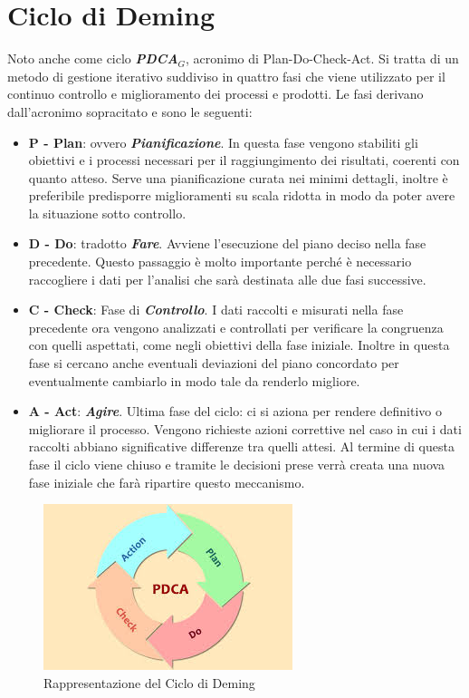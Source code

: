 \chapter{Ciclo di Deming}\label{CicloDiDeming}
Noto anche come ciclo \textbf{\textit{PDCA$_G$}}, acronimo di Plan-Do-Check-Act.
Si tratta di un metodo di gestione iterativo suddiviso in quattro fasi che viene utilizzato per il continuo controllo e miglioramento dei processi e prodotti.
Le fasi derivano dall'acronimo sopracitato e sono le seguenti:
\begin{itemize}
	\item \textbf{P - Plan}:  ovvero \textbf{\textit{Pianificazione}}. In questa fase vengono stabiliti gli obiettivi e i processi necessari per il raggiungimento dei risultati, coerenti con quanto atteso.
	Serve una pianificazione curata nei minimi dettagli, inoltre è preferibile predisporre miglioramenti su scala ridotta in modo da poter avere la situazione sotto controllo.
	\item \textbf{D - Do}: tradotto \textbf{\textit{Fare}}. Avviene l’esecuzione del piano deciso nella fase precedente.
	Questo passaggio è molto importante perché è necessario raccogliere i dati per l’analisi che sarà destinata alle due fasi successive.
	\item \textbf{C - Check}: Fase di \textbf{\textit{Controllo}}. I dati raccolti e misurati nella fase precedente ora vengono analizzati e controllati per verificare la congruenza con quelli aspettati, come negli obiettivi della fase iniziale.
	Inoltre in questa fase si cercano anche eventuali deviazioni del piano concordato per eventualmente cambiarlo in modo tale da renderlo migliore.
	\item \textbf{A - Act}: \textbf{\textit{Agire}}. Ultima fase del ciclo: ci si aziona per rendere definitivo o migliorare il processo. Vengono richieste azioni correttive nel caso in cui i dati raccolti abbiano significative differenze tra quelli attesi. 
	Al termine di questa fase il ciclo viene chiuso e tramite le decisioni prese verrà creata una nuova fase iniziale che farà ripartire questo meccanismo.
\end{itemize}
\begin{figure}[!ht]
	\begin{center}
		\includegraphics[width=0.48\linewidth]{../immagini/Ciclo_di_Deming.jpg}
		\caption{Rappresentazione del Ciclo di Deming}
	\end{center}
\end{figure}
